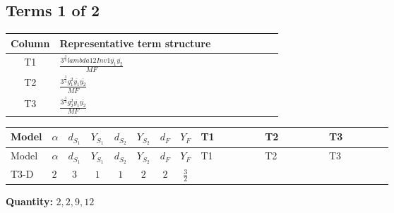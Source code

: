 \documentclass[8pt]{article}
\begin{document}
\begin{landscape}
\subsection*{Terms 1 of 2}
\begin{center}
\begin{tabular}{@{}c >{\raggedright\arraybackslash}p{0.82\linewidth}@{}}
\toprule
Column & Representative term structure \\
\midrule
T1 & \(\displaystyle \frac{3^{\frac{3}{4}} lambda12Inv1 \overline{y_{1}} \overline{y_{2}}}{MF}\) \\
\midrule
T2 & \(\displaystyle \frac{3^{\frac{3}{4}} g_{1}^{2} \overline{y_{1}} \overline{y_{2}}}{MF}\) \\
\midrule
T3 & \(\displaystyle \frac{3^{\frac{3}{4}} g_{2}^{2} \overline{y_{1}} \overline{y_{2}}}{MF}\) \\
\midrule
\bottomrule
\end{tabular}
\end{center}
\smallskip
\tiny
\begin{longtable}{@{}llcccccc >{\raggedright\arraybackslash}p{0.21\linewidth} >{\raggedright\arraybackslash}p{0.21\linewidth} >{\raggedright\arraybackslash}p{0.21\linewidth}@{}}
\toprule
Model & $\alpha$ & $d_{S_1}$ & $Y_{S_1}$ & $d_{S_2}$ & $Y_{S_2}$ & $d_F$ & $Y_F$ & T1 & T2 & T3 \\
\midrule
\endfirsthead
\toprule
Model & $\alpha$ & $d_{S_1}$ & $Y_{S_1}$ & $d_{S_2}$ & $Y_{S_2}$ & $d_F$ & $Y_F$ & T1 & T2 & T3 \\
\midrule
\endhead
T3-D & $2$ & $3$ & $1$ & $1$ & $2$ & $2$ & $\frac{3}{2}$ & \scriptsize\adjustbox{max width=\linewidth}{$\begin{gathered} \frac{3^{\frac{3}{4}} lambda12Inv1 \overline{y_{1}} \overline{y_{2}}}{6 MF}\end{gathered}$} & \scriptsize\adjustbox{max width=\linewidth}{$\begin{gathered} \frac{9 \cdot 3^{\frac{3}{4}} g_{1}^{2} \overline{y_{1}} \overline{y_{2}}}{8 MF}\end{gathered}$} & \scriptsize\adjustbox{max width=\linewidth}{$\begin{gathered} \frac{17 \cdot 3^{\frac{3}{4}} g_{2}^{2} \overline{y_{1}} \overline{y_{2}}}{24 MF}\end{gathered}$} \\
\midrule
\bottomrule
\end{longtable}
\clearpage
\noindent\textbf{Quantity: }$\mathrm{2,2,9,12}$\par\smallskip

\end{landscape}
\end{document}
